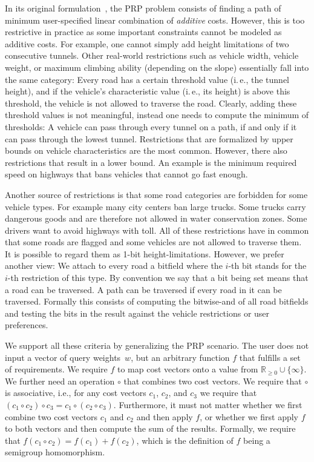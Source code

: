 \documentclass{sig-alternate}
\newcommand{\ie}{i.\,e.\xspace}
\newcommand{\arccost}{\ensuremath{c}}
\newcommand{\queryweight}{\ensuremath{w}}
\begin{document}
In its original formulation~\cite{fns-opca-14}, the PRP problem  consists of finding a path of minimum user-specified linear combination of \emph{additive} costs.
However, this is too restrictive in practice as some important constraints cannot be modeled as additive costs.
For example, one cannot simply add height limitations of two consecutive tunnels.
Other real-world restrictions such as vehicle width, vehicle weight, or maximum climbing ability (depending on the slope) essentially fall into the same category: Every road has a certain threshold value (\ie, the tunnel height), and if the vehicle's characteristic value (\ie, its height) is above this threshold, the vehicle is not allowed to traverse the road.
Clearly, adding these threshold values is not meaningful, instead one needs to compute the minimum of thresholds: A vehicle can pass through every tunnel on a path, if and only if it can pass through the lowest tunnel.
Restrictions that are formalized by upper bounds on vehicle characteristics are the most common.
However, there also restrictions that result in a lower bound. An example is the minimum required speed on highways that bans vehicles that cannot go fast enough.


Another source of restrictions is that some road categories are forbidden for some vehicle types. 
For example many city centers ban large trucks. Some trucks carry dangerous goods and are therefore not allowed in water conservation zones. Some drivers want to avoid highways with toll.
All of these restrictions have in common that some roads are flagged and some vehicles are not allowed to traverse them.
It is possible to regard them as 1-bit height-limitations. 
However, we prefer another view: We attach to every road a bitfield where the $i$-th bit stands for the $i$-th restriction of this type.
By convention we say that a bit being set means that a road can be traversed.
A path can be traversed if every road in it can be traversed.
Formally this consists of computing the bitwise-and of all road bitfields and testing the bits in the result against the vehicle restrictions or user preferences.

We support all these criteria by generalizing the PRP scenario.
The user does not input a vector of query weights~\queryweight, but an arbitrary function $f$ that fulfills a set of requirements.
We require $f$ to map cost vectors onto a value from $\mathbb{R}_{\ge 0} \cup \{\infty\}$. 
We further need an operation $\circ$ that combines two cost vectors. We require that $\circ$ is associative, i.e., for any cost vectors $\arccost_1$, $\arccost_2$, and $\arccost_3$ we require that $(\arccost_1 \circ \arccost_2) \circ \arccost_3 = \arccost_1 \circ (\arccost_2 \circ \arccost_3)$.  
Furthermore, it must not matter whether we first combine two cost vectors $\arccost_1$ and $\arccost_2$ and then apply $f$, or whether we first apply $f$ to both vectors and then compute the sum of the results. 
Formally, we require that $f(\arccost_1 \circ \arccost_2) = f(\arccost_1) + f(\arccost_2)$, which is the definition of $f$ being a semigroup homomorphism.
\end{document}

